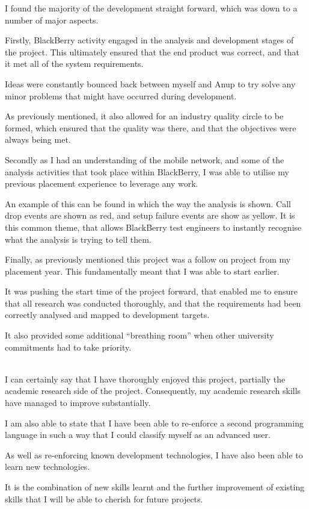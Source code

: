 I found the majority of the development straight forward, which was down to a 
number of major aspects. 

Firstly, BlackBerry activity engaged in the analysis and development stages of 
the project. This ultimately ensured that the end product was correct, and that
it met all of the system requirements.

Ideas were constantly bounced back between myself and Anup to try solve any 
minor problems that might have occurred during development. 

As previously mentioned, it also allowed for an industry quality circle to be 
formed, which ensured that the quality was there, and that the objectives were
always being met.

Secondly as I had an understanding of the mobile network, and some of the 
analysis activities that took place within BlackBerry, I was able to utilise 
my previous placement experience to leverage any work. 

An example of this can be found in which the way the analysis is shown. Call 
drop events are shown as red, and setup failure events are show as yellow. It 
is this common theme, that allows BlackBerry test engineers to instantly 
recognise what the analysis is trying to tell them.

Finally, as previously mentioned this project was a follow on project from my 
placement year. This fundamentally meant that I was able to start earlier. 

It was pushing the start time of the project forward, that enabled me to ensure 
that all research was conducted thoroughly, and that the requirements had been
correctly analysed and mapped to development targets.

It also provided some additional ``breathing room'' when other university 
commitments had to take priority.

~\\

I can certainly say that I have thoroughly enjoyed this project, partially the 
academic research side of the project. Consequently, my academic research 
skills have managed to improve substantially. 

I am also able to state that I have been able to re-enforce a second 
programming language in such a way that I could classify myself as an advanced 
user. 

As well as re-enforcing known development technologies, I have also been able
to learn new technologies. 

It is the combination of new skills learnt and the further improvement of 
existing skills that I will be able to cherish for future projects.